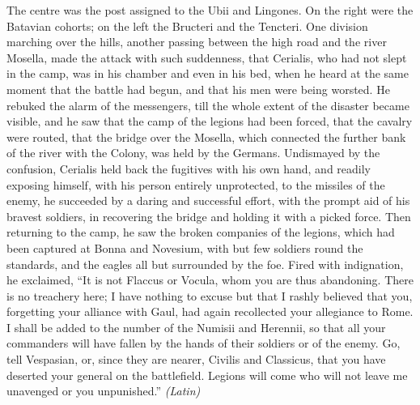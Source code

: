 The centre was the post assigned to the Ubii and Lingones. On the right were the Batavian cohorts; on the left the Bructeri and the Tencteri. One division marching over the hills, another passing between the high road and the river Mosella, made the attack with such suddenness, that Cerialis, who had not slept in the camp, was in his chamber and even in his bed, when he heard at the same moment that the battle had begun, and that his men were being worsted. He rebuked the alarm of the messengers, till the whole extent of the disaster became visible, and he saw that the camp of the legions had been forced, that the cavalry were routed, that the bridge over the Mosella, which connected the further bank of the river with the Colony, was held by the Germans. Undismayed by the confusion, Cerialis held back the fugitives with his own hand, and readily exposing himself, with his person entirely unprotected, to the missiles of the enemy, he succeeded by a daring and successful effort, with the prompt aid of his bravest soldiers, in recovering the bridge and holding it with a picked force. Then returning to the camp, he saw the broken companies of the legions, which had been captured at Bonna and Novesium, with but few soldiers round the standards, and the eagles all but surrounded by the foe. Fired with indignation, he exclaimed, ``It is not Flaccus or Vocula, whom you are thus abandoning. There is no treachery here; I have nothing to excuse but that I rashly believed that you, forgetting your alliance with Gaul, had again recollected your allegiance to Rome. I shall be added to the number of the Numisii and Herennii, so that all your commanders will have fallen by the hands of their soldiers or of the enemy. Go, tell Vespasian, or, since they are nearer, Civilis and Classicus, that you have deserted your general on the battlefield. Legions will come who will not leave me unavenged or you unpunished.'' \emph{(Latin)}


